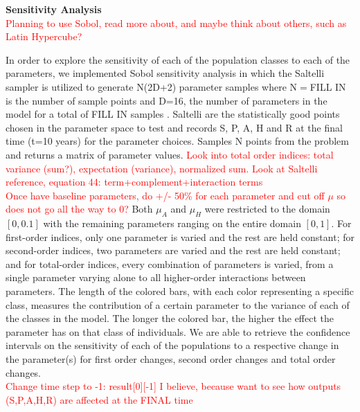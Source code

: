 \documentclass[12pt]{article}
\begin{document}

\textbf{Sensitivity Analysis} \\
\textcolor{red}{Planning to use Sobol, read more about, and maybe think about others, such as Latin Hypercube?} 

In order to explore the sensitivity of each of the population classes to each of the parameters, we implemented Sobol sensitivity analysis in which the Saltelli sampler is utilized to generate N(2D+2) parameter samples where N$=$FILL IN is the number of sample points and D=16, the number of parameters in the model for a total of FILL IN samples \cite{Herman}. 
Saltelli are the statistically good points chosen in the parameter space to test and records S, P, A, H and R at the final time (t=10 years) for the parameter choices. Samples N points from the problem and returns a matrix of parameter values. 
\textcolor{red}{Look into total order indices: total variance (sum?), expectation (variance), normalized sum. Look at Saltelli reference, equation 44: term+complement+interaction terms} \\
\textcolor{red}{Once have baseline parameters, do +/- 50\% for each parameter and cut off $\mu$ so does not go all the way to 0?}
Both $\mu_{A}$ and $\mu_{H}$ were restricted to the domain $[0,0.1]$ with the remaining parameters ranging on the entire domain $[0,1]$. For first-order indices, only one parameter is varied and the rest are held constant; for second-order indices, two parameters are varied and the rest are held constant; and for total-order indices, every combination of parameters is varied, from a single parameter varying alone to all higher-order interactions between parameters. The length of the colored bars, with each color representing a specific class, measures the contribution of a certain parameter to the variance of each of the classes in the model. The longer the colored bar, the higher the effect the parameter has on that class of individuals. We are able to retrieve the confidence intervals on the sensitivity of each of the populations to a respective change in the parameter(s) for first order changes, second order changes and total order changes. \\
\textcolor{red}{Change time step to -1: result[0][-1] I believe, because want to see how outputs (S,P,A,H,R) are affected at the FINAL time}
\end{document}
